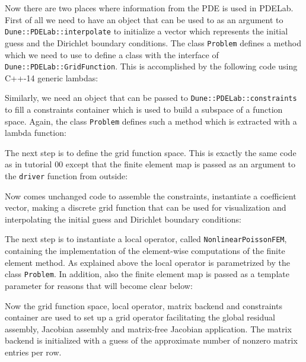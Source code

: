 \documentclass[a4paper,12pt]{article}
\begin{document}
Now there are two places where information from the PDE is used
in PDELab. First of all we need to have an object that can be used to
as an argument to \lstinline{Dune::PDELab::interpolate} to
initialize a vector which represents the initial guess and the Dirichlet boundary conditions.
The class \lstinline{Problem} defines a method which we need to use
to define a class with the interface of \lstinline{Dune::PDELab::GridFunction}.
This is accomplished by the following code using C++-14 generic lambdas:


Similarly, we need an object that can be passed to 
\lstinline{Dune::PDELab::constraints} to fill a constraints container which
is used to build a subspace of a function space. Again, the
class \lstinline{Problem} defines such a method which is extracted with
a lambda function:


The next step is to define the grid function space. This is
exactly the same code as in tutorial 00 except that the finite element
map is passed as an argument to the \lstinline{driver} function from outside:


Now comes unchanged code to assemble the constraints,
instantiate a coefficient vector, making a discrete grid function that can be
used for visualization and interpolating the initial guess and Dirichlet boundary 
conditions:


The next step is to instantiate a local operator, called \lstinline{NonlinearPoissonFEM},
containing the implementation of the element-wise computations of the finite element
method. As explained above the local operator is parametrized by the class 
\lstinline{Problem}. In addition, also the finite element map is passed as a template
parameter for reasons that will become clear below:


Now the grid function space, local operator, matrix backend and
constraints container are used to set up a grid operator facilitating
the global residual assembly, Jacobian assembly and matrix-free Jacobian application.
The matrix backend is initialized with a guess of the approximate number
of nonzero matrix entries per row.

\end{document}
